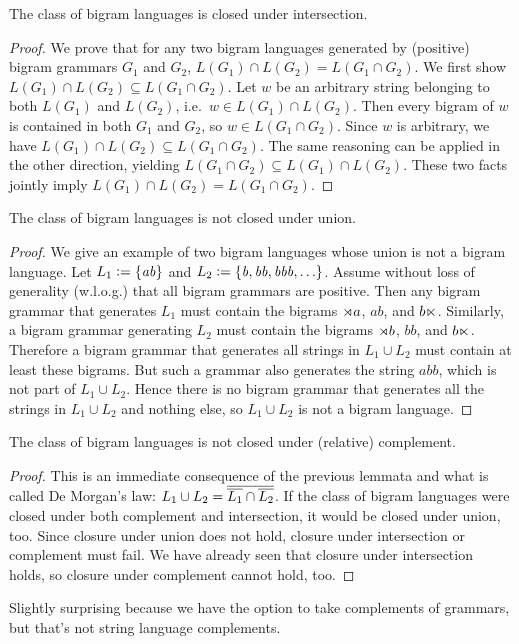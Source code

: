 \begin{lemma}
    The class of bigram languages is closed under intersection.    
\end{lemma}
%
\begin{proof}
    We prove that for any two bigram languages generated by (positive) bigram grammars $G_1$ and $G_2$, $L(G_1) \cap L(G_2) = L(G_1 \cap G_2)$.
    We first show $L(G_1) \cap L(G_2) \subseteq L(G_1 \cap G_2)$.
    Let $w$ be an arbitrary string belonging to both $L(G_1)$ and $L(G_2)$, i.e.\ $w \in L(G_1) \cap L(G_2)$.
    Then every bigram of $w$ is contained in both $G_1$ and $G_2$, so $w \in L(G_1 \cap G_2)$.
    Since $w$ is arbitrary, we have $L(G_1) \cap L(G_2) \subseteq L(G_1 \cap G_2)$.
    The same reasoning can be applied in the other direction, yielding $L(G_1 \cap G_2) \subseteq L(G_1) \cap L(G_2)$.
    These two facts jointly imply $L(G_1) \cap L(G_2) = L(G_1 \cap G_2)$.
\end{proof}
%

\begin{lemma}
    The class of bigram languages is not closed under union. 
\end{lemma}
%
\begin{proof}
    We give an example of two bigram languages whose union is not a bigram language.
    Let $L_1 \mathrel{\mathop:}= \left \{ \mathit{ab} \right \}$ and $L_2 \mathrel{\mathop:}= \left \{ \mathit{b}, \mathit{bb}, \mathit{bbb}, \ldots \right \}$.
    Assume without loss of generality (w.l.o.g.) that all bigram grammars are positive.
    Then any bigram grammar that generates $L_1$ must contain the bigrams $\rtimes a$, $\mathit{ab}$, and $b \ltimes$.
    Similarly, a bigram grammar generating $L_2$ must contain the bigrams $\rtimes b$, $\mathit{bb}$, and $b \ltimes$.
    Therefore a bigram grammar that generates all strings in $L_1 \cup L_2$ must contain at least these bigrams.
    But such a grammar also generates the string $\mathit{abb}$, which is not part of $L_1 \cup L_2$.
    Hence there is no bigram grammar that generates all the strings in $L_1 \cup L_2$ and nothing else, so $L_1 \cup L_2$ is not a bigram language.
\end{proof}
%

\begin{lemma}
    The class of bigram languages is not closed under (relative) complement.
\end{lemma}
%
\begin{proof}
    This is an immediate consequence of the previous lemmata and what is called De Morgan's law: $L_1 \cup L_2 =  \overline{ \overline{L_1}  \cap  \overline{L_2} } $.
    If the class of bigram languages were closed under both complement and intersection, it would be closed under union, too.
    Since closure under union does not hold, closure under intersection or complement must fail.
    We have already seen that closure under intersection holds, so closure under complement cannot hold, too.
\end{proof}
%
Slightly surprising because we have the option to take complements of grammars, but that's not string language complements.

